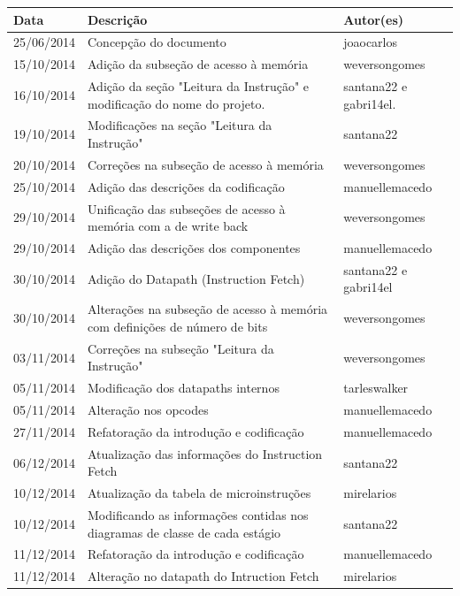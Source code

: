 \documentclass{report}
\begin{document}
\begin{table}[ht]
\begin{tabular}[pos]{|m{2cm} | m{7.2cm} | m{3.8cm}|}
\textbf{Data} & \cellcolor[gray]{0.9}\textbf{Descrição} & \cellcolor[gray]{0.9} \textbf{Autor(es)}\\ \hline
      \small 25/06/2014 & \small Concepção do documento & \small joaocarlos \\ \hline
      \small 15/10/2014 & \small Adição da subseção de acesso à memória & \small weversongomes \\ \hline
      \small 16/10/2014 & \small Adição da seção "Leitura da Instrução" e modificação do nome do projeto. & \small santana22 e gabri14el.\\ \hline
      \small 19/10/2014 & \small Modificações na seção "Leitura da Instrução" & \small santana22 \\ \hline
      \small 20/10/2014 & \small Correções na subseção de acesso à memória & \small weversongomes \\ \hline
      \small 25/10/2014 & \small Adição das descrições da codificação & \small manuellemacedo \\ \hline
      \small 29/10/2014 & \small Unificação das subseções de acesso à memória com a de write back & \small weversongomes \\ \hline
      \small 29/10/2014 & \small Adição das descrições dos componentes & \small manuellemacedo \\ \hline
      \small 30/10/2014 & \small Adição do Datapath (Instruction Fetch) & \small santana22 e gabri14el \\ \hline
      \small 30/10/2014 & \small Alterações na subseção de acesso à memória com definições de número de bits & \small weversongomes \\ \hline
      \small 03/11/2014 & \small Correções na subseção "Leitura da Instrução" & \small weversongomes \\ \hline
      \small 05/11/2014 & \small Modificação dos datapaths internos & \small tarleswalker \\ \hline
      \small 05/11/2014 & \small Alteração nos opcodes & \small manuellemacedo \\ \hline
      \small 27/11/2014 & \small Refatoração da introdução e codificação & \small manuellemacedo \\ \hline
      \small 06/12/2014 & \small Atualização das informações do Instruction Fetch & \small santana22 \\ \hline
      \small 10/12/2014 & \small Atualização da tabela de microinstruções  & \small mirelarios \\ \hline
      \small 10/12/2014 & \small Modificando as informações contidas nos diagramas de classe de cada estágio  & \small  santana22 \\ \hline
      \small 11/12/2014 & \small Refatoração da introdução e codificação & \small manuellemacedo \\ \hline
      \small 11/12/2014 & \small Alteração no datapath do Intruction Fetch  & \small mirelarios \\ \hline
	\end{tabular}
	\end{table}
\end{document}
